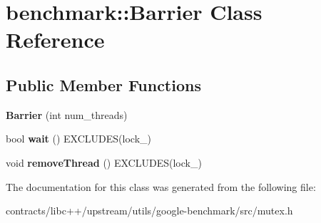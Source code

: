 \hypertarget{classbenchmark_1_1_barrier}{}\section{benchmark\+:\+:Barrier Class Reference}
\label{classbenchmark_1_1_barrier}
\subsection*{Public Member Functions}
\begin{DoxyCompactItemize}
\item 
\mbox{\label{classbenchmark_1_1_barrier_a5ecc70b13f063bd2066b32d0e49bd55c}} 
{\bfseries Barrier} (int num\+\_\+threads)
\item 
\mbox{\label{classbenchmark_1_1_barrier_a8b0a5501d62afe515ac01814f291fbb8}} 
bool {\bfseries wait} () E\+X\+C\+L\+U\+D\+ES(lock\+\_\+)
\item 
\mbox{\label{classbenchmark_1_1_barrier_a6783187d02b09dbd551b0241e31a197e}} 
void {\bfseries remove\+Thread} () E\+X\+C\+L\+U\+D\+ES(lock\+\_\+)
\end{DoxyCompactItemize}


The documentation for this class was generated from the following file\+:\begin{DoxyCompactItemize}
\item 
contracts/libc++/upstream/utils/google-\/benchmark/src/mutex.\+h\end{DoxyCompactItemize}
